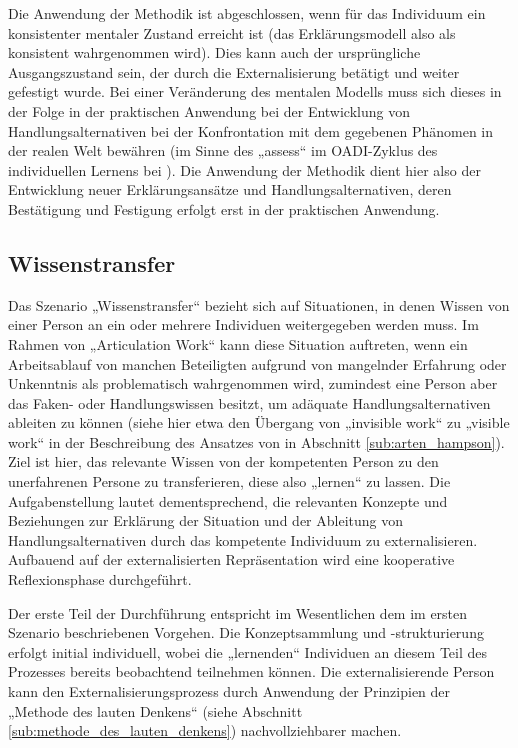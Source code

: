 Die Anwendung der Methodik ist abgeschlossen, wenn für das Individuum ein konsistenter mentaler Zustand erreicht ist (das Erklärungsmodell also als konsistent wahrgenommen wird). Dies kann auch der ursprüngliche Ausgangszustand sein, der durch die Externalisierung betätigt und weiter gefestigt wurde. Bei einer Veränderung des mentalen Modells muss sich dieses in der Folge in der praktischen Anwendung bei der Entwicklung von Handlungsalternativen bei der Konfrontation mit dem gegebenen Phänomen in der realen Welt bewähren (im Sinne des „assess“ im \gls{OADI}-Zyklus des individuellen Lernens bei \citet{Kim93}). Die Anwendung der Methodik dient hier also der Entwicklung neuer Erklärungsansätze und Handlungsalternativen, deren Bestätigung und Festigung erfolgt erst in der praktischen Anwendung.


\subsection{Wissenstransfer} %
\label{sub:wissenstransfer}

Das Szenario „Wissenstransfer“ bezieht sich auf Situationen, in denen Wissen von einer Person an ein oder mehrere Individuen weitergegeben werden muss. Im Rahmen von „Articulation Work“ kann diese Situation auftreten, wenn ein Arbeitsablauf von manchen Beteiligten aufgrund von mangelnder Erfahrung oder Unkenntnis als problematisch wahrgenommen wird, zumindest eine Person aber das Faken- oder Handlungswissen besitzt, um adäquate Handlungsalternativen ableiten zu können (siehe hier etwa den Übergang von „invisible work“ zu „visible work“ in der Beschreibung des Ansatzes von \citet{Hampson05} in Abschnitt \ref{sub:arten_hampson}). Ziel ist hier, das relevante Wissen von der kompetenten Person zu den unerfahrenen Persone zu transferieren, diese also „lernen“ zu lassen. Die Aufgabenstellung lautet dementsprechend, die relevanten Konzepte und Beziehungen zur Erklärung der Situation und der Ableitung von Handlungsalternativen durch das kompetente Individuum zu externalisieren. Aufbauend auf der externalisierten Repräsentation wird eine kooperative Reflexionsphase durchgeführt. 

Der erste Teil der Durchführung entspricht im Wesentlichen dem im ersten Szenario beschriebenen Vorgehen. Die Konzeptsammlung und -strukturierung erfolgt initial individuell, wobei die „lernenden“ Individuen an diesem Teil des Prozesses bereits beobachtend teilnehmen können. Die externalisierende Person kann den Externalisierungsprozess durch Anwendung der Prinzipien der „Methode des lauten Denkens“ (siehe Abschnitt \ref{sub:methode_des_lauten_denkens}) nachvollziehbarer machen. 

